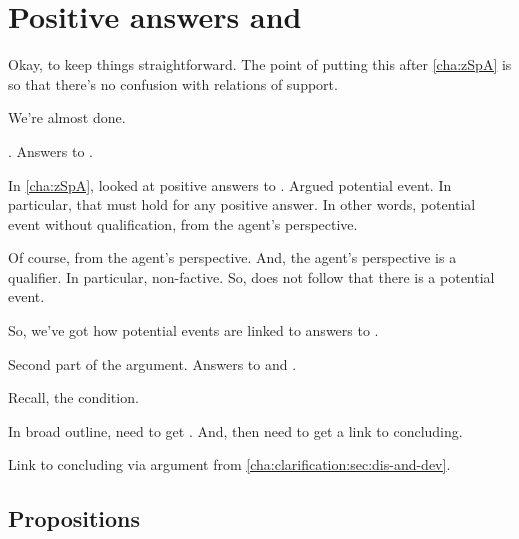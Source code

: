 \chapter{Positive answers and \qWhyV{}}
\label{cha:zSpAwhy}

\begin{note}
  \color{red}
  Okay, to keep things straightforward.
  The point of putting this after \autoref{cha:zSpA} is so that there's no confusion with relations of support.
\end{note}

\begin{note}
  We're almost done.

  \qzS{}.
  Answers to \qzS{}.

  In \autoref{cha:zSpA}, looked at positive answers to \qzS{}.
  Argued potential event.
  In particular, that \ptivity{} must hold for any positive answer.
  In other words, potential event without qualification, from the agent's perspective.

  Of course, from the agent's perspective.
  And, the agent's perspective is a qualifier.
  In particular, non-factive.
  So, does not follow that there is a potential event.
\end{note}

\begin{note}
  So, we've got how potential events are linked to answers to \qzS{}.

  Second part of the argument.
  Answers to \qzS{} and \qWhyV{}.
\end{note}

\begin{note}
  Recall, the condition.
\end{note}

\begin{note}
  In broad outline, need to get \support{}.
  And, then need to get a link to concluding.

  Link to concluding via argument from \autoref{cha:clarification:sec:dis-and-dev}.
\end{note}

\section{Propositions}
\label{cha:zSpAwhy:sec:proposition}

